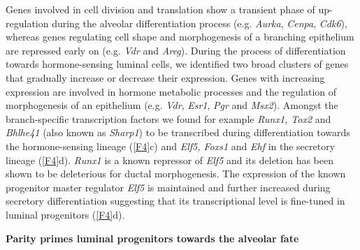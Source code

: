 \documentclass[titlepage, 12pt, oneside]{amsart}
\begin{document}
Genes involved in cell division and translation show a transient phase of up-regulation during the alveolar differentiation process (e.g. \textit{Aurka}, \textit{Cenpa}, \textit{Cdk6}), whereas genes regulating cell shape and morphogenesis of a branching epithelium are repressed early on (e.g. \textit{Vdr} and \textit{Areg}).
During the process of differentiation towards hormone-sensing luminal cells, we identified two broad clusters of genes that gradually increase or decrease their expression.
Genes with increasing expression are involved in hormone metabolic processes and the regulation of morphogenesis of an epithelium (e.g. \textit{Vdr}, \textit{Esr1}, \textit{Pgr} and \textit{Msx2}).
Amongst the branch-specific transcription factors we found for example \textit{Runx1, Tox2} and \textit{Bhlhe41} (also known as \textit{Sharp1}) to be transcribed during differentiation towards the hormone-sensing lineage (\autoref{F4}c) and \textit{Elf5, Foxs1} and \textit{Ehf} in the secretory lineage (\autoref{F4}d).
\textit{Runx1} is a known repressor of \textit{Elf5} and its deletion has been shown to be deleterious for ductal morphogenesis\autocite{VanBragt2014}.
The expression of the known progenitor master regulator \textit{Elf5} is maintained and further increased during secretory differentiation suggesting that its transcriptional level is fine-tuned in luminal progenitors (\autoref{F4}d).

\textbf{Parity primes luminal progenitors towards the alveolar fate}
\end{document}
